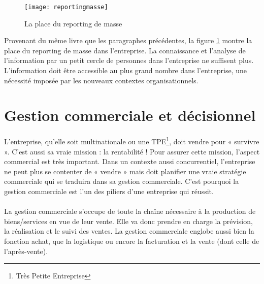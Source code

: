 \begin{figure}[H]
    \centering
    \texttt{[image: reportingmasse]}
    \caption{La place du reporting de masse}
    \label{fig:reportingmasse}
\end{figure}
 Provenant du même livre que les paragraphes précédentes, la figure \ref{fig:reportingmasse} montre la place du reporting de masse dans l'entreprise. La connaissance et l'analyse de l'information par un petit cercle de personnes dans l'entreprise ne suffisent plus. L'information doit être accessible au plus grand nombre dans l'entreprise, une nécessité imposée par les nouveaux contextes organisationnels.









\section{Gestion commerciale et décisionnel}
L’entreprise, qu’elle soit multinationale ou une TPE\footnote{Très Petite Entreprise}, doit vendre pour « survivre ». C’est aussi sa vraie mission : la rentabilité ! Pour assurer cette mission, l’aspect commercial est très important. Dans un contexte aussi concurrentiel, l’entreprise ne peut plus se contenter de « vendre » mais doit planifier une vraie stratégie commerciale qui se traduira dans sa gestion commerciale. C’est pourquoi la gestion commerciale est l’un des piliers d’une entreprise qui réussit.
\paragraph{}
La gestion commerciale s’occupe de toute la chaîne nécessaire à la production de biens/services en vue de leur vente. Elle va donc prendre en charge la prévision, la réalisation et le suivi des ventes. La gestion commerciale englobe aussi bien la fonction achat, que la logistique ou encore la facturation et la vente (dont celle de l’après-vente). 

